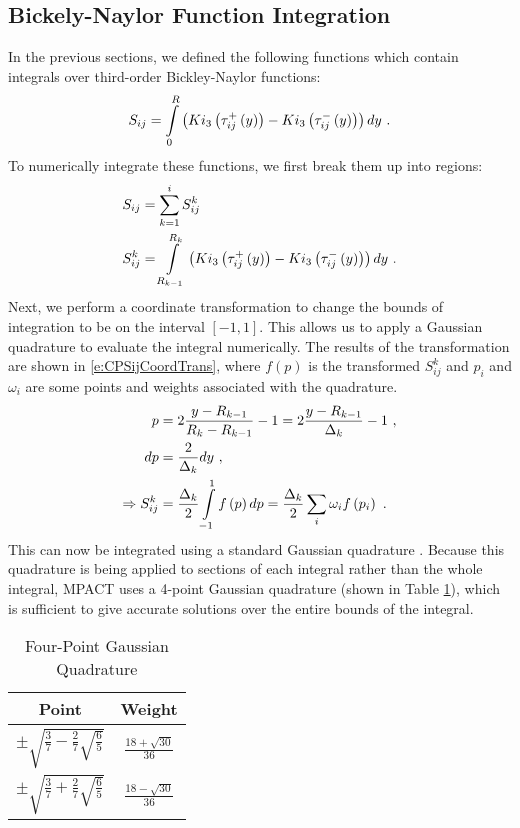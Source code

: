 \subsection{Bickely-Naylor Function Integration}

In the previous sections, we defined the following functions which contain integrals over third-order Bickley-Naylor functions:
\begin{equation}\label{e:CPSijDef}
S_{ij} = \intop_0^{R} \left(Ki_3\left(\tau_{ij}^+\left(y\right)\right) - Ki_3\left(\tau_{ij}^-\left(y\right)\right)\right) dy\ .
\end{equation}
To numerically integrate these functions, we first break them up into regions:
\begin{subequations}\label{e:CPSijSubInt}
  \begin{align}
  S_{ij} &= \sum_{k=1}^i S_{ij}^k \\
  S_{ij}^k &= \intop_{R_{k-1}}^{R_k} \left(Ki_3\left(\tau_{ij}^+\left(y\right)\right) - Ki_3\left(\tau_{ij}^-\left(y\right)\right)\right) dy\ .
  \end{align}
\end{subequations}
Next, we perform a coordinate transformation to change the bounds of integration to be on the interval $\left[-1, 1\right]$.  This allows us to apply a Gaussian quadrature to evaluate the integral numerically.  The results of the transformation are shown in \ref{e:CPSijCoordTrans}, where $f\left(p\right)$ is the transformed $S_{ij}^k$ and $p_i$ and $\omega_i$ are some points and weights associated with the quadrature.
\begin{subequations}\label{e:CPSijCoordTrans}
  \begin{align}
  p &= 2\frac{y - R_{k-1}}{R_k - R_{k-1}} - 1 = 2\frac{y - R_{k-1}}{\Delta_k} -1\ , \\
  dp &= \frac{2}{\Delta_k}dy\ , \\
  \Rightarrow S_{ij}^k &= \frac{\Delta_k}{2} \intop_{-1}^1 f\left(p\right)dp = \frac{\Delta_k}{2} \sum_i \omega_i f\left(p_i\right)\ .
  \end{align}
\end{subequations}
This can now be integrated using a standard Gaussian quadrature \cite{HandbookOfMathFunctions1972}.  Because this quadrature is being applied to sections of each integral rather than the whole integral, MPACT uses a 4-point Gaussian quadrature (shown in Table \ref{t:gaussQuad}), which is sufficient to give accurate solutions over the entire bounds of the integral.

\begin{table}[h]
  \centering
  \caption{Four-Point Gaussian Quadrature}\label{t:gaussQuad}
  \begin{tabular}{|c|c|}\hline
    Point & Weight \\\hline
    $\pm \sqrt{\frac{3}{7} - \frac{2}{7}\sqrt{\frac{6}{5}}}$ & $\frac{18 + \sqrt{30}}{36}$ \\\hline
    $\pm \sqrt{\frac{3}{7} + \frac{2}{7}\sqrt{\frac{6}{5}}}$ & $\frac{18 - \sqrt{30}}{36}$ \\\hline
  \end{tabular}
\end{table}